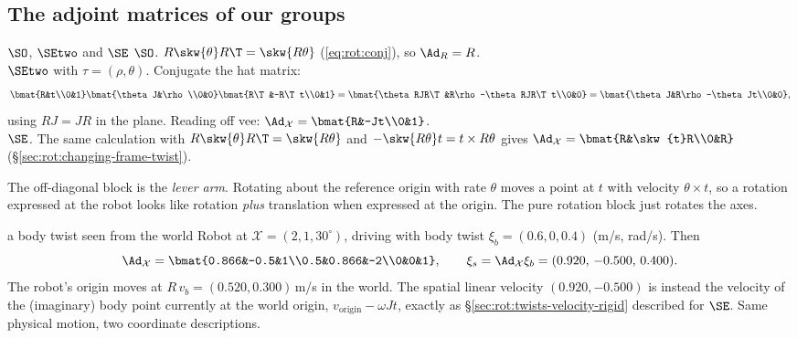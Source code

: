 \subsection{The adjoint matrices of our groups}\label{sec:lie:adjoint-matrices}

\begin{deriv}{$\SO$, $\SEtwo$ and $\SE$}
\emph{$\SO$.} $R\skw{\theta}R\T=\skw{R\theta}$ (\eqref{eq:rot:conj}), so $\Ad_R=R$.\\
\emph{$\SEtwo$} with $\tau=(\rho,\theta)$. Conjugate the hat matrix:
\[
\bmat{R&t\\0&1}\bmat{\theta J&\rho\\0&0}\bmat{R\T&-R\T t\\0&1}=\bmat{\theta RJR\T&R\rho-\theta RJR\T t\\0&0}=\bmat{\theta J&R\rho-\theta Jt\\0&0},
\]
using $RJ=JR$ in the plane. Reading off vee: $\Ad_{\mathcal X}=\bmat{R&-Jt\\0&1}$.\\
\emph{$\SE$.} The same calculation with $R\skw{\theta}R\T=\skw{R\theta}$ and $-\skw{R\theta}t=t\times R\theta$ gives $\Ad_{\mathcal X}=\bmat{R&\skw{t}R\\0&R}$ (\S\ref{sec:rot:changing-frame-twist}).
\end{deriv}

The off-diagonal block is the \emph{lever arm}. Rotating about the reference origin with rate $\theta$ moves a point at $t$ with velocity $\theta\times t$, so a rotation expressed at the robot looks like rotation \emph{plus} translation when expressed at the origin. The pure rotation block just rotates the axes.

\begin{example}{a body twist seen from the world}
Robot at $\mathcal X=(2,1,30^\circ)$, driving with body twist $\xi_b=(0.6,0,0.4)$ (m/s, rad/s). Then
\[
\Ad_{\mathcal X}=\bmat{0.866&-0.5&1\\0.5&0.866&-2\\0&0&1},\qquad \xi_s=\Ad_{\mathcal X}\xi_b=(0.920,\,-0.500,\,0.400).
\]
The robot's origin moves at $R\,v_b=(0.520,0.300)$\,m/s in the world. The spatial linear velocity $(0.920,-0.500)$ is instead the velocity of the (imaginary) body point currently at the world origin, $v_{\text{origin}}-\omega Jt$, exactly as \S\ref{sec:rot:twists-velocity-rigid} described for $\SE$. Same physical motion, two coordinate descriptions.
\end{example}
